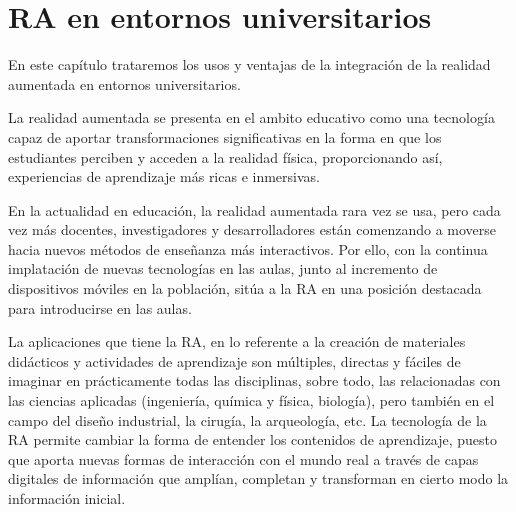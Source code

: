 %
%
%
%


\chapter{RA en entornos universitarios } \label{chap:RAEntornosUniversitarios}  

En este capítulo trataremos los usos y ventajas de la integración de la realidad aumentada en entornos universitarios.

La realidad aumentada se presenta en el ambito educativo como una tecnología capaz de aportar transformaciones significativas en la forma en que los estudiantes perciben y acceden a la realidad física, proporcionando así, experiencias de aprendizaje más ricas e inmersivas.

En la actualidad en educación, la realidad aumentada rara vez se usa, pero cada vez más docentes, investigadores y desarrolladores están comenzando a moverse hacia nuevos métodos de enseñanza más interactivos. Por ello, con la continua implatación de nuevas tecnologías en las aulas, junto al incremento de dispositivos móviles en la población, sitúa a la RA en una posición destacada para introducirse en las aulas. 


La aplicaciones que tiene la RA, en lo referente a la creación de materiales didácticos y actividades de aprendizaje son múltiples, directas y fáciles de imaginar en prácticamente todas las disciplinas, sobre todo, las relacionadas con las ciencias aplicadas (ingeniería, química y física, biología), pero también en el campo del diseño industrial, la cirugía, la arqueología, etc.
La tecnología de la RA permite cambiar la forma de entender los contenidos de aprendizaje, puesto que aporta nuevas formas de interacción con el mundo real a través de capas digitales de información que amplían, completan y transforman en cierto modo la información inicial.



